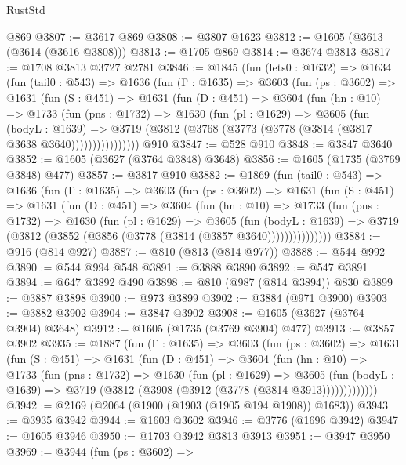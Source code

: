 \begin{lexlean}{RustStd}
\begin{coremodule}
    @869
@3807 := @3617 @869
@3808 := @3807 @1623
@3812 := @1605 (@3613 (@3614 (@3616 @3808)))
@3813 := @1705 @869
@3814 := @3674 @3813
@3817 := @1708 @3813 @3727 @2781
@3846 := @1845
    (fun (lets0 : @1632) =>
    @1634
      (fun (tail0 : @543) =>
      @1636
        (fun (Γ : @1635) =>
        @3603
          (fun (ps : @3602) =>
          @1631
            (fun (S : @451) =>
            @1631
              (fun (D : @451) =>
              @3604
                (fun (hn : @10) =>
                @1733
                  (fun (pns : @1732) =>
                  @1630
                    (fun (pl : @1629) =>
                    @3605
                      (fun (bodyL : @1639) =>
                      @3719 (@3812 (@3768 (@3773 (@3778 (@3814 (@3817 @3638 @3640))))))))))))))))
    @910
@3847 := @528 @910
@3848 := @3847 @3640
@3852 := @1605 (@3627 (@3764 @3848) @3648)
@3856 := @1605 (@1735 (@3769 @3848) @477)
@3857 := @3817 @910
@3882 := @1869
    (fun (tail0 : @543) =>
    @1636
      (fun (Γ : @1635) =>
      @3603
        (fun (ps : @3602) =>
        @1631
          (fun (S : @451) =>
          @1631
            (fun (D : @451) =>
            @3604
              (fun (hn : @10) =>
              @1733
                (fun (pns : @1732) =>
                @1630
                  (fun (pl : @1629) =>
                  @3605
                    (fun (bodyL : @1639) =>
                    @3719 (@3812 (@3852 (@3856 (@3778 (@3814 (@3857 @3640)))))))))))))))
@3884 := @916 (@814 @927)
@3887 := @810 (@813 (@814 @977))
@3888 := @544 @992
@3890 := @544 @994 @548
@3891 := @3888 @3890
@3892 := @547 @3891
@3894 := @647 @3892 @490
@3898 := @810 (@987 (@814 @3894)) @830
@3899 := @3887 @3898
@3900 := @973 @3899
@3902 := @3884 (@971 @3900)
@3903 := @3882 @3902
@3904 := @3847 @3902
@3908 := @1605 (@3627 (@3764 @3904) @3648)
@3912 := @1605 (@1735 (@3769 @3904) @477)
@3913 := @3857 @3902
@3935 := @1887
    (fun (Γ : @1635) =>
    @3603
      (fun (ps : @3602) =>
      @1631
        (fun (S : @451) =>
        @1631
          (fun (D : @451) =>
          @3604
            (fun (hn : @10) =>
            @1733
              (fun (pns : @1732) =>
              @1630
                (fun (pl : @1629) =>
                @3605
                  (fun (bodyL : @1639) =>
                  @3719 (@3812 (@3908 (@3912 (@3778 (@3814 @3913)))))))))))))
@3942 := @2169 (@2064 (@1900 (@1903 (@1905 @194 @1908)) @1683))
@3943 := @3935 @3942
@3944 := @1603 @3602
@3946 := @3776 (@1696 @3942)
@3947 := @1605 @3946
@3950 := @1703 @3942 @3813 @3913
@3951 := @3947 @3950
@3969 := @3944
    (fun (ps : @3602) =>

\end{coremodule}
\end{lexlean}
